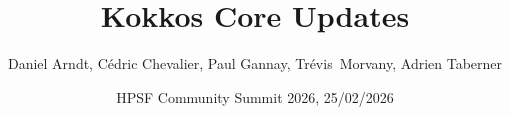 
\usepackage{tikz}
\graphicspath{{assets/images}}
\usepackage{multicol}
\usepackage{pgfplots}

\def\ornlid{THIS WILL NEED TO BE UPDATED AFTER RESOLUTION}

\title{Kokkos Core Updates}

\author{Daniel Arndt, C\'edric Chevalier, Paul Gannay, Tr\'evis~Morvany, Adrien Taberner}

\date{HPSF Community Summit 2026, 25/02/2026}



\newcommand{\mycaption}[1]{%
    \begin{center}
        \scriptsize #1
    \end{center}%
}



\begin{frame}
  \titlepage
\end{frame}






